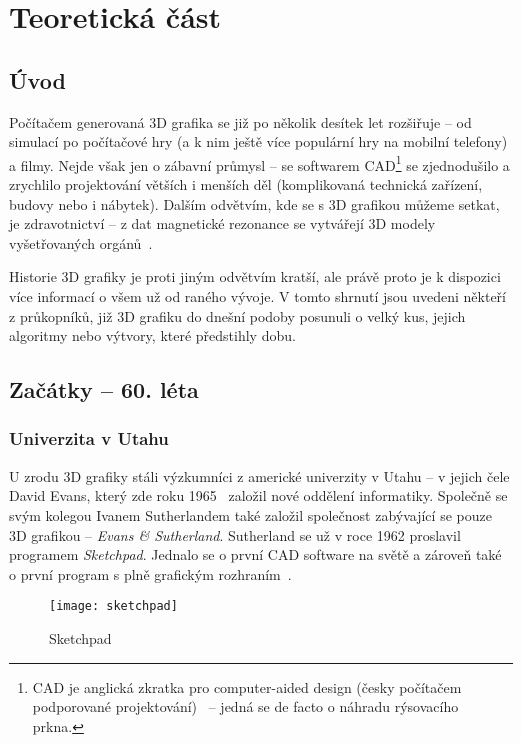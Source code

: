 \documentclass[a4paper, 11pt]{report}
\begin{document}
\part{Teoretická část}
\begin{chapterwithoutpagebreak}
\chapter{Úvod}
Počítačem generovaná 3D grafika se již po několik desítek let rozšiřuje -- od simulací po počítačové hry (a k nim ještě více populární hry na mobilní telefony) a filmy. Nejde však jen o zábavní průmysl -- se softwarem CAD\footnote{CAD je anglická zkratka pro computer-aided design (česky počítačem podporované projektování)~\cite{wiki:cad} -- jedná se de facto o náhradu rýsovacího prkna.} se zjednodušilo a zrychlilo projektování větších i menších děl (komplikovaná technická zařízení, budovy nebo i nábytek). Dalším odvětvím, kde se s 3D grafikou můžeme setkat, je zdravotnictví -- z dat magnetické rezonance se vytvářejí 3D modely vyšetřovaných orgánů~\cite{myvmc:mri}.

Historie 3D grafiky je proti jiným odvětvím kratší, ale právě proto je k dispozici více informací o všem už od raného vývoje. V tomto shrnutí jsou uvedeni někteří z průkopníků, již 3D grafiku do dnešní podoby posunuli o velký kus, jejich algoritmy nebo výtvory, které předstihly dobu.

\chapter{Začátky -- 60. léta}
\section{Univerzita v Utahu}
U zrodu 3D grafiky stáli výzkumníci z americké univerzity v Utahu -- v jejich čele David Evans, který zde roku 1965~\cite{ethw:evans} založil nové oddělení informatiky. Společně se svým kolegou Ivanem Sutherlandem také založil společnost zabývající se pouze 3D grafikou -- \emph{Evans \& Sutherland}. Sutherland se už v roce 1962 proslavil programem \emph{Sketchpad}. Jednalo se o první CAD software na světě a zároveň také o první program s plně grafickým rozhraním~\cite{ufo:history}.

\begin{figure}[h]
    \centering
    \texttt{[image: sketchpad]}
    \caption[Sketchpad]{Sketchpad~\cite{pic:sketchpad}}
\end{figure}


\end{chapterwithoutpagebreak}
\end{document}
